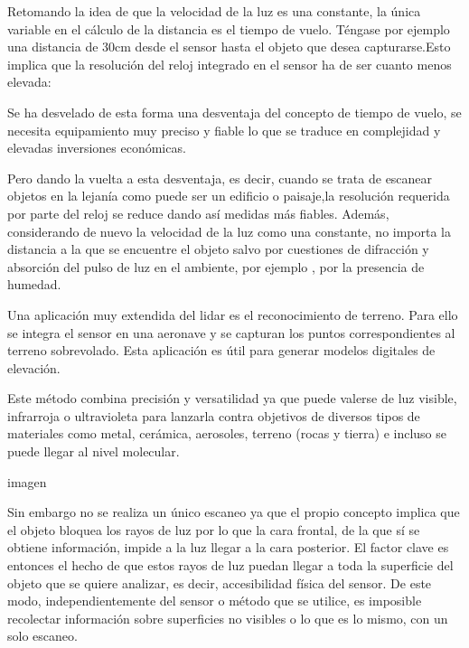 Retomando la idea de que la velocidad de la luz es una constante, la única variable en el cálculo de la distancia es el tiempo de vuelo. Téngase por ejemplo una distancia de 30cm desde el sensor hasta el objeto que desea capturarse.Esto implica que la resolución del reloj integrado en el sensor ha de ser cuanto menos elevada:


Se ha desvelado de esta forma una desventaja del concepto de tiempo de vuelo, se necesita equipamiento muy preciso y fiable lo que se traduce en complejidad y elevadas inversiones económicas.

Pero dando la vuelta a esta desventaja, es decir, cuando se trata de escanear objetos en la lejanía como puede ser un edificio o paisaje,la resolución requerida por parte del reloj se reduce dando así medidas más fiables. Además, considerando de nuevo la velocidad de la luz como una constante, no importa la distancia a la que se encuentre el objeto salvo por cuestiones de difracción y absorción del pulso de luz en el ambiente, por ejemplo , por la presencia de humedad.

Una aplicación muy extendida del lidar es el reconocimiento de terreno. Para ello se integra el sensor en una aeronave y se capturan los puntos correspondientes al terreno sobrevolado. Esta aplicación es útil para generar modelos digitales de elevación.



 

Este método combina precisión y versatilidad ya que puede valerse de luz visible, infrarroja o ultravioleta para lanzarla contra objetivos de diversos tipos de materiales como metal, cerámica, aerosoles, terreno (rocas y tierra) e incluso se puede llegar al nivel molecular. 
 


imagen

Sin embargo no se realiza un único escaneo ya que el propio concepto implica que el objeto bloquea los rayos de luz por lo que la cara frontal, de la que sí se obtiene información, impide a la luz llegar a la cara posterior. El factor clave es entonces el hecho de que estos rayos de luz puedan llegar a toda la superficie del objeto que se quiere analizar, es decir, accesibilidad física del sensor.
De este modo, independientemente del sensor o método que se utilice, es imposible recolectar
información sobre superficies no visibles o lo que es lo mismo, con un solo escaneo.


